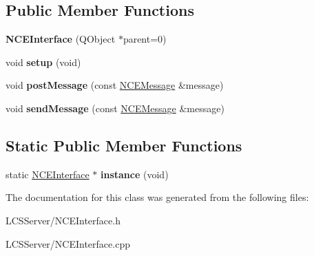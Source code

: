 \subsection*{Public Member Functions}
\begin{DoxyCompactItemize}
\item 
\mbox{\label{class_n_c_e_interface_aec68e1a283ae5633dad5d750547f5e74}} 
{\bfseries N\+C\+E\+Interface} (Q\+Object $\ast$parent=0)
\item 
\mbox{\label{class_n_c_e_interface_abf6f3aa621e46ab329033beef6c44a90}} 
void {\bfseries setup} (void)
\item 
\mbox{\label{class_n_c_e_interface_aa419dd65501c979e936309983dffcb86}} 
void {\bfseries post\+Message} (const \hyperlink{class_n_c_e_message}{N\+C\+E\+Message} \&message)
\item 
\mbox{\label{class_n_c_e_interface_aff52e3e08e79219ee4b632a320136aa7}} 
void {\bfseries send\+Message} (const \hyperlink{class_n_c_e_message}{N\+C\+E\+Message} \&message)
\end{DoxyCompactItemize}
\subsection*{Static Public Member Functions}
\begin{DoxyCompactItemize}
\item 
\mbox{\label{class_n_c_e_interface_aac13b43a007b971cdb5a7e488e80cb2b}} 
static \hyperlink{class_n_c_e_interface}{N\+C\+E\+Interface} $\ast$ {\bfseries instance} (void)
\end{DoxyCompactItemize}


The documentation for this class was generated from the following files\+:\begin{DoxyCompactItemize}
\item 
L\+C\+S\+Server/N\+C\+E\+Interface.\+h\item 
L\+C\+S\+Server/N\+C\+E\+Interface.\+cpp\end{DoxyCompactItemize}
